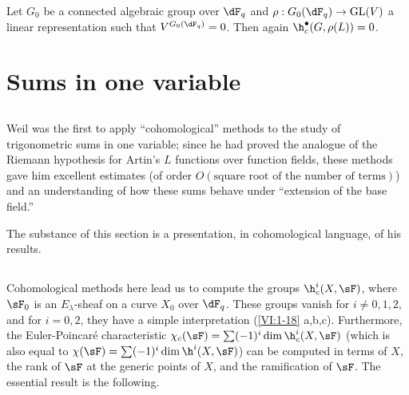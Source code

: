 Let $G_0$ be a connected algebraic group over $\dF_q$ and 
$\rho:G_0(\dF_q) \to \operatorname{GL}(V)$ a linear representation 
such that $V^{G_0(\dF_q)}=0$. Then again $\h_c^\bullet(G,\rho(L))=0$. 










\section{Sums in one variable}\label{VI:3}





\subsection{}\label{VI:3-1}

Weil was the first to apply ``cohomological'' methods to 
the study of trigonometric sums in one variable; since he had 
proved the analogue of the Riemann hypothesis for Artin's $L$ functions 
over function fields, these methods gave him excellent 
estimates (of order $O(\text{square root of the number of terms})$) and an 
understanding of how these sums behave under ``extension of the base field.'' 

The substance of this section is a presentation, in cohomological language, of 
his results. 





\subsection{}\label{VI:3-2}

Cohomological methods here lead us to compute the groups 
$\h_c^i(X,\sF)$, where $\sF_0$ is an $E_\lambda$-sheaf on a curve $X_0$ over 
$\dF_q$. These groups vanish for $i\ne 0,1,2$, and for 
$i=0,2$, they have a simple interpretation (\ref{VI:1-18} a,b,c). Furthermore, the 
Euler-Poincaré characteristic 
$\chi_c(\sF) = \sum (-1)^i \dim \h_c^i(X,\sF)$ (which is also equal to 
$\chi(\sF) = \sum (-1)^i \dim \h^i(X,\sF)$) can be computed in terms of 
$X$, the rank of $\sF$ at the generic points of $X$, and the 
ramification of $\sF$. The essential result is the following. 

